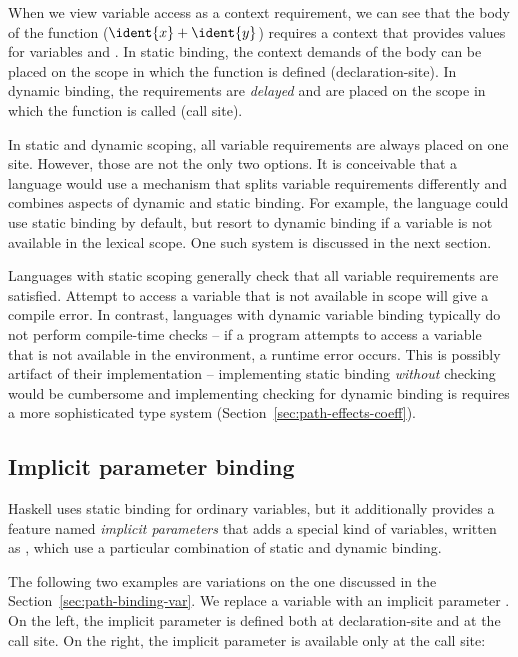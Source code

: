\noindent
When we view variable access as a context requirement, we can see that the body of the function
($\ident{x}+\ident{y}$) requires a context that provides values for variables  and
. In static binding, the context demands of the body can be placed on the scope in
which the function is defined (declaration-site). In dynamic binding, the requirements are
\emph{delayed} and are placed on the scope in which the function is called (call site).

In static and dynamic scoping, all variable requirements are always placed on one site. However,
those are not the only two options. It is conceivable that a language would use a mechanism that
splits variable requirements differently and combines aspects of dynamic and static binding. For
example, the language could use static binding by default, but resort to dynamic binding if a
variable is not available in the lexical scope. One such system is discussed in the next section.

Languages with static scoping generally check that all variable requirements are satisfied.
Attempt to access a variable that is not available in scope will give a compile error. In contrast,
languages with dynamic variable binding typically do not perform compile-time checks -- if a
program attempts to access a variable that is not available in the environment, a runtime error
occurs. This is possibly artifact of their implementation -- implementing static binding
\emph{without} checking would be cumbersome and implementing checking for dynamic binding is
requires a more sophisticated type system (Section~\ref{sec:path-effects-coeff}).


\subsection{Implicit parameter binding}
\label{sec:path-binding-impl}

Haskell uses static binding for ordinary variables, but it additionally provides a feature named
\emph{implicit parameters} \cite{app-implicit-parameters} that adds a special kind of variables,
written as , which use a particular combination of static and dynamic binding.

The following two examples are variations on the one discussed in the Section~\ref{sec:path-binding-var}.
We replace a variable  with an implicit parameter . On the left, the
implicit parameter is defined both at declaration-site and at the call site. On the right, the
implicit parameter is available only at the call site:

